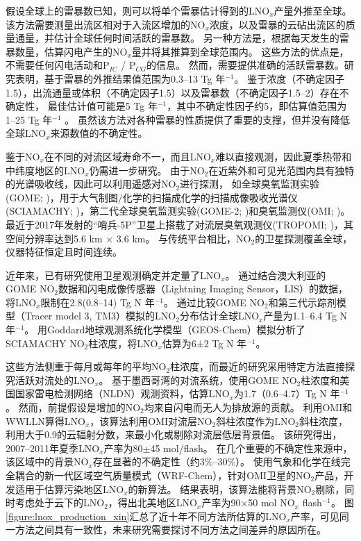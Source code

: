 假设全球上的雷暴数已知，则可以将单个雷暴估计得到的LNO$_x$产量外推至全球\citep{Chameides.1987,Huntrieser.1998,Huntrieser.2002}。
该方法需要测量出流区相对于入流区增加的NO$_x$浓度，以及雷暴的云砧出流区的质量通量，并估计全球任何时间活跃的雷暴数。
另一种方法是，根据每天发生的雷暴数量，估算闪电产生的NO$_x$量并将其推算到全球范围内\citep{Ridley.2004}。 这些方法的优点是，不需要任何闪电活动和P\textrm{$_{IC}$} / P\textrm{$_{CG}$}的信息。
然而，需要提供准确的活跃雷暴数。研究表明，基于雷暴的外推结果值范围为0.3--13 Tg 年$^{-1}$。
鉴于浓度（不确定因子1.5），出流通量或体积（不确定因子1.5）以及雷暴数（不确定因子1.5--2）存在不确定性，
最佳估计值可能是5 Tg 年$^{-1}$，其中不确定性因子约5，即估算值范围为1--25 Tg 年$^{-1}$ \citep{Chameides.1987}。
虽然该方法对各种雷暴的性质提供了重要的支撑，但并没有降低全球LNO$_x$来源数值的不确定性。

鉴于NO$_x$在不同的对流区域寿命不一，而且LNO$_x$难以直接观测，因此夏季热带和中纬度地区的LNO$_x$仍需进一步研究。
由于NO$_2$在近紫外和可见光范围内具有独特的光谱吸收线，因此可以利用遥感对NO$_2$进行探测\citep{Platt.1983}，
如全球臭氧监测实验(GOME; \citet{Burrows.1999})，用于大气制图/化学的扫描成化学的扫描成像吸收光谱仪(SCIAMACHY; \citet{Bovensmann.1999})，第二代全球臭氧监测实验(GOME-2; \citet{Callies.2000})和臭氧监测仪(OMI; \citet{Levelt.2006})。
最近于2017年发射的“哨兵-5P”卫星上搭载了对流层臭氧观测仪(TROPOMI; \citet{Veefkind.2012})，其空间分辨率达到5.6 km $\times$ 3.6 km。
与传统平台相比，NO$_2$的卫星探测覆盖全球，仪器特征恒定且时间连续。

近年来，已有研究使用卫星观测确定并定量了LNO$_x$。
\citet{Beirle.2004}通过结合澳大利亚的GOME NO$_2$数据和闪电成像传感器（Lightning Imaging Sensor，LIS）的数据，将LNO$_x$限制在2.8(0.8--14) Tg N 年$^{-1}$。
\citet{Boersma.2005}通过比较GOME NO$_2$和第三代示踪剂模型（Tracer model 3, TM3）模拟的LNO$_2$分布估计全球LNO$_x$产量为1.1--6.4 Tg N 年$^{-1}$。
\citet{Martin.2007a}用Goddard地球观测系统化学模型（GEOS-Chem）模拟分析了SCIAMACHY NO$_2$柱浓度，将LNO$_x$估算为6±2 Tg N 年$^{-1}$。

这些方法侧重于每月或每年的平均NO$_2$柱浓度，而最近的研究采用特定方法直接探究活跃对流处的LNO$_x$。
\citet{Beirle.2006}基于墨西哥湾的对流系统，使用GOME NO$_2$柱浓度和美国国家雷电检测网络（NLDN）观测资料，估算LNO$_x$为1.7（0.6–4.7）Tg N 年$^{-1}$。
然而，前提假设是增加的NO$_2$均来自闪电而无人为排放源的贡献。
\citet{Pickering.2016} 利用OMI和WWLLN算得LNO$_x$，该算法利用OMI对流层NO$_2$斜柱浓度作为LNO$_2$斜柱浓度，利用大于0.9的云辐射分数，来最小化或剔除对流层低层背景值。
该研究得出，2007--2011年夏季LNO$_x$产率为80$\pm$45 mol/flash。
在几个重要的不确定性来源中，该区域中的背景NO$_x$存在显著的不确定性（约3\%--30\%）。
\citet{Zhang.2020b}使用气象和化学在线完全耦合的新一代区域空气质量模式（WRF-Chem），针对OMI卫星的NO$_2$产品，开发适用于估算污染地区LNO$_x$的新算法。
结果表明，该算法能将背景NO$_2$剔除，同时考虑处于云下的LNO$_2$，得出北美地区LNO$_x$产率为90$\times$50 mol NO$_x$ flash$^{-1}$。
图\ref{figure:lnox_production_xin}汇总了近十年不同方法所估算的LNO$_x$产率，可见同一方法之间具有一致性，未来研究需要探讨不同方法之间差异的原因所在。

